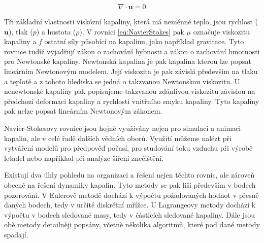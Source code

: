 \begin{equation}
	\nabla \cdot \mathbf{u} = 0
	\label{eq:NavierStokes2}
\end{equation}

Tři základní vlastnosti viskózní kapaliny, která má neměnné teplo, jsou rychlost ($\mathbf{u}$), tlak ($p$) a hustota ($\rho$). V rovnici \ref{eq:NavierStokes} pak $\mu$ označuje viskozitu kapaliny a $f$ ostatní síly působící na kapalinu, jako například gravitace. Tyto rovnice tudíž vyjadřují zákon o zachování hybnosti a zákon o zachování hmotnosti pro Newtonské kapaliny. Newtonská kapalina je pak kapalina kterou lze popsat lineárním Newtonovým modelem. Její viskozita je pak závislá především na tlaku a teplotě a z tohoto hlediska se jedná o takzvanou Newtonskou viskozitu. U nenewtonské kapaliny pak popisujeme takzvanou zdánlivou viskozitu závislou na předchozí deformaci kapaliny a rychlosti vnitřního smyku kapaliny. Tyto kapaliny pak nelze popsat lineárním Newtonovým zákonem.\cite{StejskalJan2013Pmks}

Navier-Stokesovy rovnice jsou hojně využívány nejen pro simulaci a animaci kapalin, ale v celé řadě dalších vědních oborů. Využití můžeme nalézt při vytváření modelů pro předpověď počasí, pro studování toku vzduchu při výrobě letadel nebo například při analýze šíření znečištění.
\break

Existují dva úhly pohledu na organizaci a řešení nejen těchto rovnic, ale zároveň obecně na řešení dynamiky kapalin. Tyto metody se pak liší především v bodech pozorování. V Eulerově metodě dochází k výpočtu požadovaných hodnot v přesně daných bodech, tedy v určité diskrétní mřížce. U Lagrangeovy metody dochází k výpočtu v bodech sledované masy, tedy v částicích sledované kapaliny. Dále jsou obě metody detailněji popsány, včetně několika algoritmů, které pod dané metody spadají.

